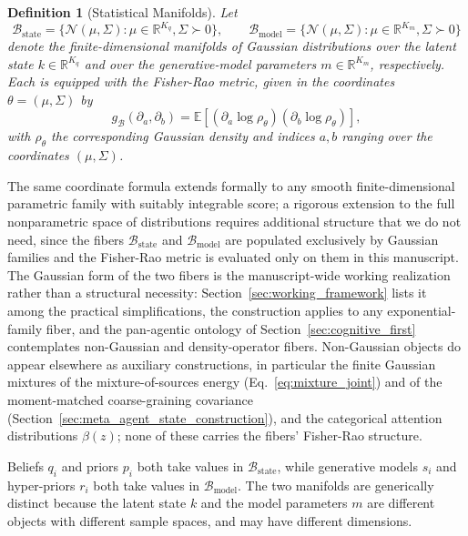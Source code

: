 \documentclass[11pt]{article}
\newtheorem{definition}{Definition}
\begin{document}
\begin{definition}[Statistical Manifolds]
Let
\begin{equation}
\mathcal{B}_{\mathrm{state}} = \{\mathcal{N}(\mu, \Sigma) : \mu \in \mathbb{R}^{K_q}, \Sigma \succ 0\},
\qquad
\mathcal{B}_{\mathrm{model}} = \{\mathcal{N}(\mu, \Sigma) : \mu \in \mathbb{R}^{K_m}, \Sigma \succ 0\}
\end{equation}
denote the finite-dimensional manifolds of Gaussian distributions over the latent state $k \in \mathbb{R}^{K_q}$ and over the generative-model parameters $m \in \mathbb{R}^{K_m}$, respectively. Each is equipped with the Fisher-Rao metric, given in the coordinates $\theta = (\mu, \Sigma)$ by
\begin{equation}
g_{\mathcal{B}}(\partial_a, \partial_b) = \mathbb{E}\left[(\partial_a \log \rho_\theta)(\partial_b \log \rho_\theta)\right],
\end{equation}
with $\rho_\theta$ the corresponding Gaussian density and indices $a, b$ ranging over the coordinates $(\mu, \Sigma)$.
\end{definition}

The same coordinate formula extends formally to any smooth finite-dimensional parametric family with suitably integrable score; a rigorous extension to the full nonparametric space of distributions requires additional structure that we do not need, since the fibers $\mathcal{B}_{\mathrm{state}}$ and $\mathcal{B}_{\mathrm{model}}$ are populated exclusively by Gaussian families and the Fisher-Rao metric is evaluated only on them in this manuscript. The Gaussian form of the two fibers is the manuscript-wide working realization rather than a structural necessity: Section~\ref{sec:working_framework} lists it among the practical simplifications, the construction applies to any exponential-family fiber, and the pan-agentic ontology of Section~\ref{sec:cognitive_first} contemplates non-Gaussian and density-operator fibers. Non-Gaussian objects do appear elsewhere as auxiliary constructions, in particular the finite Gaussian mixtures of the mixture-of-sources energy (Eq.~\eqref{eq:mixture_joint}) and of the moment-matched coarse-graining covariance (Section~\ref{sec:meta_agent_state_construction}), and the categorical attention distributions $\beta(z)$; none of these carries the fibers' Fisher-Rao structure.

Beliefs $q_i$ and priors $p_i$ both take values in $\mathcal{B}_{\mathrm{state}}$, while generative models $s_i$ and hyper-priors $r_i$ both take values in $\mathcal{B}_{\mathrm{model}}$. The two manifolds are generically distinct because the latent state $k$ and the model parameters $m$ are different objects with different sample spaces, and may have different dimensions.
\end{document}
